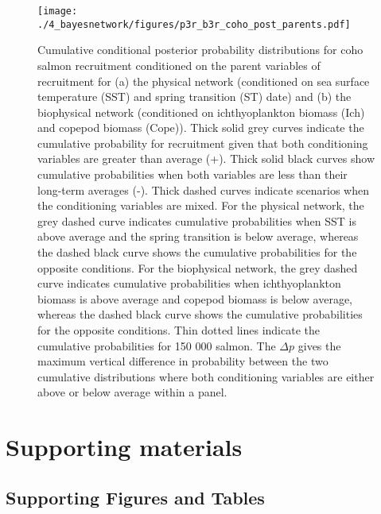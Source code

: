 \begin{figure}[htbp]
  \centering \texttt{[image: ./4\_bayesnetwork/figures/p3r\_b3r\_coho\_post\_parents.pdf]}
  \caption[Cumulative conditional posterior probability distributions for coho
           salmon recruitment conditioned on the parent variables of
           recruitment.]{Cumulative conditional posterior probability
           distributions for coho salmon recruitment conditioned on the parent
           variables of recruitment for (a) the physical network (conditioned on
           sea surface temperature (SST) and spring transition (ST) date) and
           (b) the biophysical network (conditioned on ichthyoplankton biomass
           (Ich) and copepod biomass (Cope)). Thick solid grey curves indicate
           the cumulative probability for recruitment given that both
           conditioning variables are greater than average (+). Thick solid
           black curves show cumulative probabilities when both variables are
           less than their long-term averages (-). Thick dashed curves indicate
           scenarios when the conditioning variables are mixed. For the physical
           network, the grey dashed curve indicates cumulative probabilities
           when SST is above average and the spring transition is below average,
           whereas the dashed black curve shows the cumulative probabilities for
           the opposite conditions. For the biophysical network, the grey dashed
           curve indicates cumulative probabilities when ichthyoplankton biomass
           is above average and copepod biomass is below average, whereas the
           dashed black curve shows the cumulative probabilities for the
           opposite conditions. Thin dotted lines indicate the cumulative
           probabilities for 150 000 salmon.  The \(\Delta p\) gives the maximum
           vertical difference in probability between the two cumulative
           distributions where both conditioning variables are either above or
           below average within a panel.}
  \label{fig:bn:8}
\end{figure}
\newpage



\section{Supporting materials}

\subsection{Supporting Figures and Tables}


